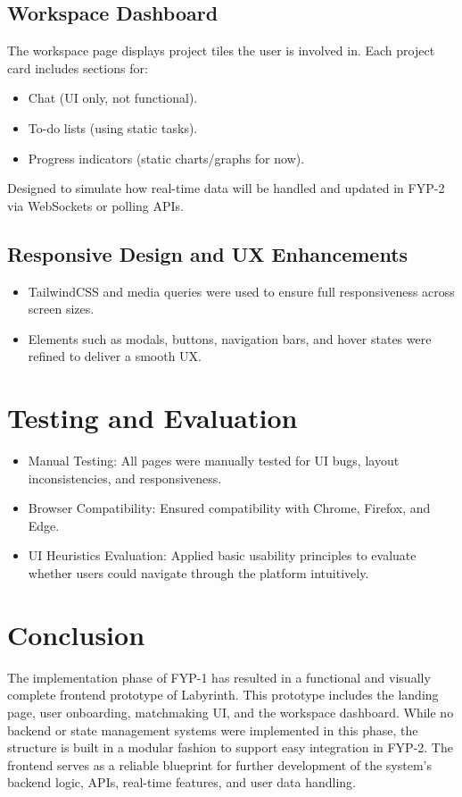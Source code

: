 \documentclass{FastFyp}
\begin{document}
\subsection{Workspace Dashboard}
The workspace page displays project tiles the user is involved in.
Each project card includes sections for:
\begin{itemize}
    \item Chat (UI only, not functional).
    \item To-do lists (using static tasks).
    \item Progress indicators (static charts/graphs for now).
\end{itemize}
Designed to simulate how real-time data will be handled and updated in FYP-2 via WebSockets or polling APIs.
\subsection{Responsive Design and UX Enhancements}
\begin{itemize}
    \item TailwindCSS and media queries were used to ensure full responsiveness across screen sizes.
    \item Elements such as modals, buttons, navigation bars, and hover states were refined to deliver a smooth UX.
\end{itemize}
\section{Testing and Evaluation}
\begin{itemize}
    \item Manual Testing: All pages were manually tested for UI bugs, layout inconsistencies, and responsiveness.
    \item Browser Compatibility: Ensured compatibility with Chrome, Firefox, and Edge.
    \item UI Heuristics Evaluation: Applied basic usability principles to evaluate whether users could navigate through the platform intuitively.
\end{itemize}
\section{Conclusion}
The implementation phase of FYP-1 has resulted in a functional and visually complete frontend prototype of Labyrinth. This prototype includes the landing page, user onboarding, matchmaking UI, and the workspace dashboard. While no backend or state management systems were implemented in this phase, the structure is built in a modular fashion to support easy integration in FYP-2. The frontend serves as a reliable blueprint for further development of the system’s backend logic, APIs, real-time features, and user data handling.
\end{document}

